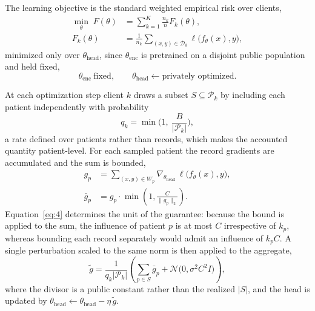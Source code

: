 The learning objective is the standard weighted empirical risk over clients,
\begin{equation}
\begin{aligned}
\min_{\theta}\; F(\theta) &= \sum_{k=1}^{K} \frac{n_k}{n} F_k(\theta), \\
F_k(\theta) &= \frac{1}{n_k}\!\!\sum_{(x,y)\in\mathcal{D}_k}\!\!
               \ell\big(f_\theta(x), y\big),
\end{aligned}
\tag{1}
\label{eq:1}
\end{equation}
minimized only over $\theta_{\mathrm{head}}$, since $\theta_{\mathrm{enc}}$ is
pretrained on a disjoint public population and held fixed,
\begin{equation}
\theta_{\mathrm{enc}}\ \text{fixed},
\qquad
\theta_{\mathrm{head}} \leftarrow \text{privately optimized}.
\tag{2}
\label{eq:2}
\end{equation}

At each optimization step client $k$ draws a subset $S \subseteq \mathcal{P}_k$
by including each patient independently with probability
\begin{equation}
q_k = \min\!\Big(1,\ \frac{B}{|\mathcal{P}_k|}\Big),
\tag{3}
\label{eq:3}
\end{equation}
a rate defined over patients rather than records, which makes the accounted
quantity patient-level. For each sampled
patient the record gradients are accumulated and the sum is bounded,
\begin{equation}
\begin{aligned}
g_p &= \!\!\sum_{(x,y)\in W_p}\!\! \nabla_{\theta_{\mathrm{head}}}\,
       \ell\big(f_\theta(x), y\big), \\
\bar{g}_p &= g_p \cdot \min\!\left(1, \frac{C}{\lVert g_p \rVert_2}\right).
\end{aligned}
\tag{4}
\label{eq:4}
\end{equation}
Equation~\eqref{eq:4} determines the unit of the guarantee: because the bound
is applied to the sum, the influence of patient
$p$ is at most $C$ irrespective of $k_p$, whereas bounding each record
separately would admit an influence of $k_p C$. A single perturbation scaled to
the same norm is then applied to the aggregate,
\begin{equation}
\tilde{g} = \frac{1}{q_k |\mathcal{P}_k|}\left( \sum_{p \in S} \bar{g}_p
+ \mathcal{N}\!\big(0, \sigma^2 C^2 I\big) \right),
\tag{5}
\label{eq:5}
\end{equation}
where the divisor is a public constant rather than the realized $|S|$,
and the head is updated by $\theta_{\mathrm{head}} \leftarrow
\theta_{\mathrm{head}} - \eta\,\tilde{g}$.

